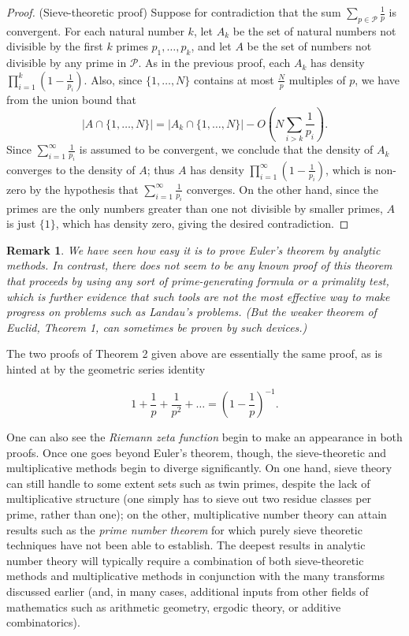 \documentclass[10pt,reqno]{amsart}
\newtheorem{remark}[theorem]{Remark}
\begin{document}
\begin{proof}
    (Sieve-theoretic proof) Suppose for contradiction that the sum $\sum_{p \in {\mathcal P}} \frac{1}{p}$ is convergent. For each natural number $k$, let $A_k$ be the set of natural numbers not divisible by the first $k$ primes $p_1,\dots,p_k$, and let $A$ be the set of numbers not divisible by any prime in $\mathcal{P}$. As in the previous proof, each $A_k$ has density $\prod_{i=1}^k (1-\frac{1}{p_i})$. Also, since $\{1,\dots,N\}$ contains at most $\frac{N}{p}$ multiples of $p$, we have from the union bound that
    \[ | A \cap \{1,\dots,N \}| = |A_k \cap \{1,\dots,N\}| - O( N \sum_{i > k} \frac{1}{p_i} ). \]
    Since $\sum_{i=1}^\infty \frac{1}{p_i}$ is assumed to be convergent, we conclude that the density of $A_k$ converges to the density of $A$; thus $A$ has density $\prod_{i=1}^\infty (1-\frac{1}{p_i})$, which is non-zero by the hypothesis that $\sum_{i=1}^\infty \frac{1}{p_i}$ converges. On the other hand, since the primes are the only numbers greater than one not divisible by smaller primes, $A$ is just $\{1\}$, which has density zero, giving the desired contradiction.
\end{proof}

\begin{remark}
    We have seen how easy it is to prove Euler’s theorem by analytic methods. In contrast, there does not seem to be any known proof of this theorem that proceeds by using any sort of prime-generating formula or a primality test, which is further evidence that such tools are not the most effective way to make progress on problems such as Landau’s problems. (But the weaker theorem of Euclid, Theorem 1, can sometimes be proven by such devices.)
\end{remark}

The two proofs of Theorem 2 given above are essentially the same proof, as is hinted at by the geometric series identity

\[ 1 + \frac{1}{p} + \frac{1}{p^2} + \dots = \left(1 - \frac{1}{p} \right)^{-1}. \]

One can also see the \emph{Riemann zeta function} begin to make an appearance in both proofs. Once one goes beyond Euler’s theorem, though, the sieve-theoretic and multiplicative methods begin to diverge significantly. On one hand, sieve theory can still handle to some extent sets such as twin primes, despite the lack of multiplicative structure (one simply has to sieve out two residue classes per prime, rather than one); on the other, multiplicative number theory can attain results such as the \emph{prime number theorem} for which purely sieve theoretic techniques have not been able to establish. The deepest results in analytic number theory will typically require a combination of both sieve-theoretic methods and multiplicative methods in conjunction with the many transforms discussed earlier (and, in many cases, additional inputs from other fields of mathematics such as arithmetic geometry, ergodic theory, or additive combinatorics).
\end{document}

